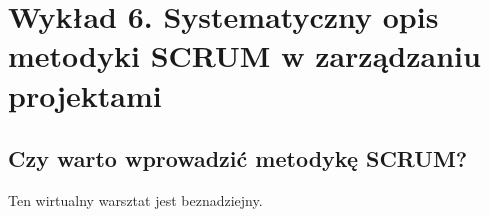 \chapter{Wykład 6. Systematyczny opis metodyki SCRUM w zarządzaniu projektami}

\section{Czy warto wprowadzić metodykę SCRUM?}

Ten wirtualny warsztat jest beznadziejny.


